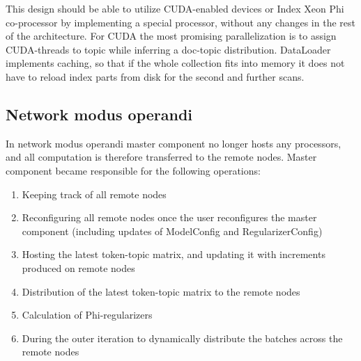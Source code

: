 \documentclass[11pt,a4paper,twoside]{report}
\begin{document}
This design should be able to utilize CUDA-enabled devices or Index Xeon Phi co-processor
by implementing a special processor, without any changes in the rest of the architecture.
For CUDA the most promising parallelization is to assign CUDA-threads to topic
while inferring a doc-topic distribution.
DataLoader implements caching, so that if the whole collection fits into memory
it does not have to reload index parts from disk for the second and further scans.

\subsection{Network modus operandi}
\label{label:network_modus_operandi}

In network modus operandi master component no longer hosts any processors,
and all computation is therefore transferred to the remote nodes.
Master component became responsible for the following operations:
\begin{enumerate}
\item Keeping track of all remote nodes
\item Reconfiguring all remote nodes once the user reconfigures the master component
      (including updates of ModelConfig and RegularizerConfig)
\item Hosting the latest token-topic matrix, and updating it with increments produced on remote nodes
\item Distribution of the latest token-topic matrix to the remote nodes
\item Calculation of Phi-regularizers
\item During the outer iteration to dynamically distribute the batches across the remote nodes
\end{enumerate}
\end{document}
